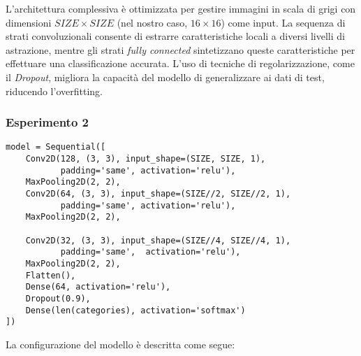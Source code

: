 L'architettura complessiva è ottimizzata per gestire immagini in scala di grigi con dimensioni $SIZE \times SIZE$ (nel nostro caso, $16 \times 16$) come input. La sequenza di strati convoluzionali consente di estrarre caratteristiche locali a diversi livelli di astrazione, mentre gli strati \textit{fully connected} sintetizzano queste caratteristiche per effettuare una classificazione accurata. 
L'uso di tecniche di regolarizzazione, come il \textit{Dropout}, migliora la capacità del modello di generalizzare ai dati di test, riducendo l'overfitting.


\subsubsection{Esperimento 2}
\begin{lstlisting}[caption={Secondo modello di CNN creato},captionpos=b]
model = Sequential([
    Conv2D(128, (3, 3), input_shape=(SIZE, SIZE, 1),
           padding='same', activation='relu'),
    MaxPooling2D(2, 2),
    Conv2D(64, (3, 3), input_shape=(SIZE//2, SIZE//2, 1),
           padding='same', activation='relu'),
    MaxPooling2D(2, 2),

    Conv2D(32, (3, 3), input_shape=(SIZE//4, SIZE//4, 1),
           padding='same',  activation='relu'),
    MaxPooling2D(2, 2),
    Flatten(),
    Dense(64, activation='relu'),
    Dropout(0.9),
    Dense(len(categories), activation='softmax')
])
\end{lstlisting}
La configurazione del modello è descritta come segue:
